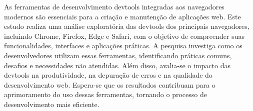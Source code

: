 
\begin{resumoutfpr}%

As ferramentas de desenvolvimento devtools integradas aos navegadores modernos são essenciais para a criação e manutenção de aplicações web. Este estudo realiza uma análise exploratória das devtools dos principais navegadores, incluindo Chrome, Firefox, Edge e Safari, com o objetivo de compreender suas funcionalidades, interfaces e aplicações práticas. A pesquisa investiga como os desenvolvedores utilizam essas ferramentas, identificando práticas comuns, desafios e necessidades não atendidas. Além disso, avalia-se o impacto das devtools na produtividade, na depuração de erros e na qualidade do desenvolvimento web. Espera-se que os resultados contribuam para o aprimoramento do uso dessas ferramentas, tornando o processo de desenvolvimento mais eficiente.

\end{resumoutfpr}